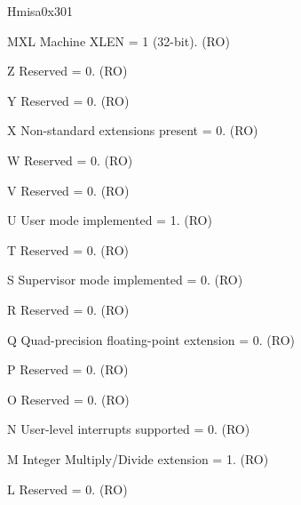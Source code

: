 \begin{register}{H}{misa}{0x301}\label{regdesc:LPMISA}
%
%
%
%
%
%
%
%
%
%
%
%
%
%
%
%
%
%
%
%
%
%
%
%
%
%
%
%
\regnewline%
\begin{regdesc}\begin{reglist}
\label{fielddesc:LPMISAMXL}\item [MXL] Machine XLEN = 1 (32-bit). (RO)
\label{fielddesc:LPMISAZ}\item [Z] Reserved = 0. (RO)
\label{fielddesc:LPMISAY}\item [Y] Reserved = 0. (RO)
\label{fielddesc:LPMISAX}\item [X] Non-standard extensions present = 0. (RO)
\label{fielddesc:LPMISAW}\item [W] Reserved = 0. (RO)
\label{fielddesc:LPMISAV}\item [V] Reserved = 0. (RO)
\label{fielddesc:LPMISAU}\item [U] User mode implemented = 1. (RO)
\label{fielddesc:LPMISAT}\item [T] Reserved = 0. (RO)
\label{fielddesc:LPMISAS}\item [S] Supervisor mode implemented = 0. (RO)
\label{fielddesc:LPMISAR}\item [R] Reserved = 0. (RO)
\label{fielddesc:LPMISAQ}\item [Q] Quad-precision floating-point extension = 0. (RO)
\label{fielddesc:LPMISAP}\item [P] Reserved = 0. (RO)
\label{fielddesc:LPMISAO}\item [O] Reserved = 0. (RO)
\label{fielddesc:LPMISAN}\item [N] User-level interrupts supported = 0. (RO)
\label{fielddesc:LPMISAM}\item [M] Integer Multiply/Divide extension = 1. (RO)
\label{fielddesc:LPMISAL}\item [L] Reserved = 0. (RO)

\end{reglist}
\end{regdesc}
\end{register}
